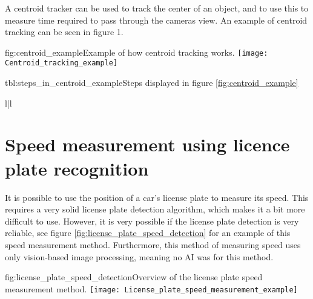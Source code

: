 A centroid tracker can be used to track the center of an object, and to use this to measure time required to pass through the cameras view. An example 
of centroid tracking can be seen in figure 1.

\begin{linfigure}{fig:centroid_example}{Example of how centroid tracking works.}
    \texttt{[image: Centroid\_tracking\_example]}
\end{linfigure}

\begin{lintable}{tbl:steps_in_centroid_example}{Steps displayed in figure \ref{fig:centroid_example}}
    \begin{lintabular}{l|l}
    \end{lintabular}
\end{lintable}

\newpage

\section{Speed measurement using licence plate recognition}
It is possible to use the position of a car's license plate to measure its speed. This requires a very solid license plate detection 
algorithm, which makes it a bit more difficult to use. However, it is very possible if the license plate detection is very reliable, see
figure \ref{fig:license_plate_speed_detection} for an example of this speed measurement method. Furthermore, this method of measuring speed
uses only vision-based image processing, meaning no AI was for this method.

\begin{linfigure}{fig:license_plate_speed_detection}{Overview of the license plate speed measurement method.}
    \texttt{[image: License\_plate\_speed\_measurement\_example]}
\end{linfigure}
